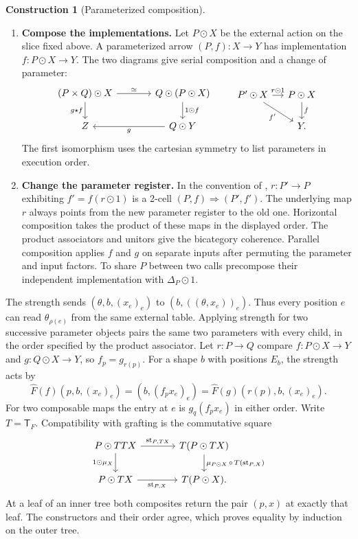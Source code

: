 \documentclass[11pt,a4paper]{article}
\theoremstyle{definition}
\newtheorem{construction}[construction]{Construction}
\theoremstyle{remark}\newaliascnt{remark}{theorem}
\numberwithin{equation}{section}
\begin{document}
\begin{construction}[Parameterized composition]\label{poly:con:para}\leavevmode
\begin{enumerate}[titledsteps]
    \item \textbf{Compose the implementations.} Let \(P\odot X\) be the external action on the slice fixed above. A parameterized arrow \((P,f):X\to Y\) has implementation \(f:P\odot X\to Y\). The two diagrams give serial composition and a change of parameter:
\[
\begin{tikzcd}[column sep=large]
 (P\times Q)\odot X\arrow[r,"\simeq"]\arrow[d,"g\star f"']&
 Q\odot(P\odot X)\arrow[d,"1\odot f"]\\
 Z&Q\odot Y\arrow[l,"g"]
\end{tikzcd}
\qquad
\begin{tikzcd}[column sep=small]
 P'\odot X\arrow[r,"r\odot1"]\arrow[dr,"f'"']&
 P\odot X\arrow[d,"f"]\\
 &Y .
\end{tikzcd}
\]
The first isomorphism uses the cartesian symmetry to list parameters in execution order. 
    \item \textbf{Change the parameter register.} In the convention of \cite[Definition G.1]{cdl}, \(r:P'\to P\) exhibiting \(f'=f(r\odot1)\) is a 2-cell \((P,f)\Rightarrow(P',f')\). The underlying map \(r\) always points from the new parameter register to the old one. Horizontal composition takes the product of these maps in the displayed order. The product associators and unitors give the bicategory coherence. Parallel composition applies \(f\) and \(g\) on separate inputs after permuting the parameter and input factors. To share \(P\) between two calls precompose their independent implementation with \(\Delta_P\odot1\).
\end{enumerate}
\end{construction}
The strength sends $(\theta,b,(x_e)_e)$ to $(b,((\theta,x_e))_e)$. Thus every position $e$ can read $\theta_{\rho(e)}$ from the same external table. Applying strength for two successive parameter objects pairs the same two parameters with every child, in the order specified by the product associator.
Let \(r:P\to Q\) compare \(f:P\odot X\to Y\) and \(g:Q\odot X\to Y\), so \(f_p=g_{r(p)}\). For a shape \(b\) with positions \(E_b\), the strength acts by
\[
 \widehat F(f)(p,b,(x_e)_e)=(b,(f_p x_e)_e)
                          =\widehat F(g)(r(p),b,(x_e)_e).
\]
For two composable maps the entry at \(e\) is \(g_q(f_p x_e)\) in either order. Write \(T=\mathsf T_F\). Compatibility with grafting is the commutative square
\[
\begin{tikzcd}[column sep=large]
 P\odot TTX \arrow[r,"\mathrm{st}_{P,TX}"] \arrow[d,"1\odot\mu_X"']&
 T(P\odot TX) \arrow[d,"{\mu_{P\odot X}\,\circ\,T(\mathrm{st}_{P,X})}"]\\
 P\odot TX \arrow[r,"\mathrm{st}_{P,X}"']&T(P\odot X).
\end{tikzcd}
\]
At a leaf of an inner tree both composites return the pair \((p,x)\) at exactly that leaf. The constructors and their order agree, which proves equality by induction on the outer tree.
\end{document}
